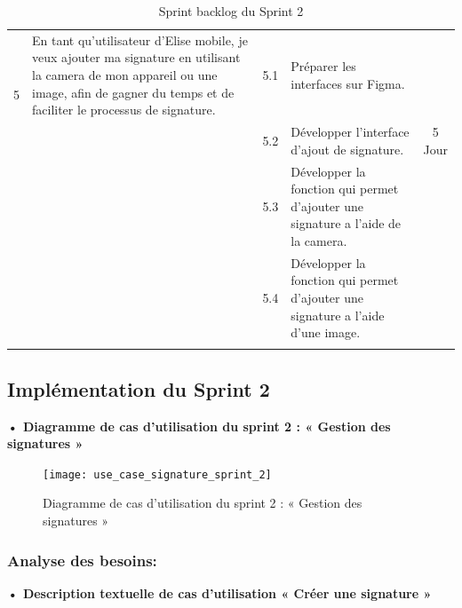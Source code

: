 \begin{adjustwidth}{-1cm}{}
\begin{longtable}{|c|p{6cm}|c|p{6cm}|c|}
      \cline{1-5}
      \multirow{2}{*}{5} & En tant qu'utilisateur d'Elise mobile, je veux ajouter ma signature en utilisant la camera de mon appareil ou une image, afin de gagner du temps et de faciliter le processus de signature. & 5.1 & Préparer les interfaces sur Figma. & \multirow{3}{*}{5 Jour} \\
      \cline{3-4}
      & & 5.2 & Développer l'interface d'ajout de signature. & \\
      \cline{3-4}
      & & 5.3 & Développer la fonction qui permet d'ajouter une signature a l'aide de la camera. & \\
      \cline{3-4}
      & & 5.4 & Développer la fonction qui permet d'ajouter une signature a l'aide d'une image. & \\
      \cline{1-5}

  \hline
  \caption{Sprint backlog du Sprint 2}
  \label{tab:sprint-backlog-2}
\end{longtable}
\end{adjustwidth}

\subsection{Implémentation du Sprint 2}
\textbf{•	Diagramme de cas d'utilisation du sprint 2 : « Gestion des signatures »}

\begin{figure}[H]
  \centering
  \texttt{[image: use\_case\_signature\_sprint\_2]}
  \caption{Diagramme de cas d'utilisation du sprint 2 : « Gestion des signatures »}
  \label{fig:UseCaseDiagram}
\end{figure}

\subsubsection{Analyse des besoins:}
\textbf{•	Description textuelle de cas d'utilisation « Créer une signature »}

